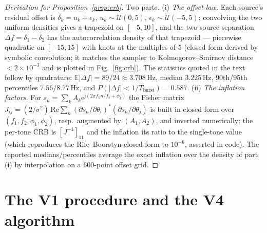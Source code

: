 \documentclass[journal]{IEEEtran}
\newcommand{\ee}{\mathrm{e}}
\newcommand{\jj}{\mathrm{j}}
\begin{document}
\begin{proof}[Derivation for Proposition~\ref{prop:crb}]
Two parts. (i) \emph{The offset law.} Each source's residual offset is
$\delta_k = u_k + \epsilon_k$, $u_k \sim \mathcal{U}(0,5)$,
$\epsilon_k \sim \mathcal{U}(-5,5)$; convolving the two uniform
densities gives a trapezoid on $[-5, 10]$, and the two-source
separation $\Delta f = \delta_1 - \delta_2$ has the autocorrelation
density of that trapezoid --- piecewise quadratic on $[-15, 15]$
with knots at the multiples of $5$ (closed form derived by symbolic
convolution; it matches the sampler to Kolmogorov--Smirnov distance
$< 2 \times 10^{-3}$ and is plotted in Fig.~\ref{fig:crb}). The
statistics quoted in the text follow by quadrature:
$\mathbb{E}|\Delta f| = 89/24 \approx 3.708$\,Hz, median
$3.225$\,Hz, 90th/95th percentiles $7.56/8.77$\,Hz, and
$P(|\Delta f| < 1/T_{\mathrm{burst}}) = 0.587$.
(ii) \emph{The inflation factors.} For
$s_n = \sum_k A_k \ee^{\jj(2\pi f_k n / f_s + \phi_k)}$ the Fisher
matrix $J_{ij} = (2/\sigma^2)\,\mathrm{Re}\sum_n (\partial s_n /
\partial \theta_i)^* (\partial s_n / \partial \theta_j)$ is built in
closed form over $(f_1, f_2, \phi_1, \phi_2)$, resp.\ augmented by
$(A_1, A_2)$, and inverted numerically; the per-tone CRB is
$[J^{-1}]_{11}$ and the inflation its ratio to the single-tone value
(which reproduces the Rife--Boorstyn closed form to $10^{-6}$, asserted
in code). The reported medians/percentiles average the exact inflation
over the density of part (i) by interpolation on a $600$-point offset
grid.
\end{proof}

\section{The V1 procedure and the V4 algorithm}
\label{app:alg}
\end{document}
